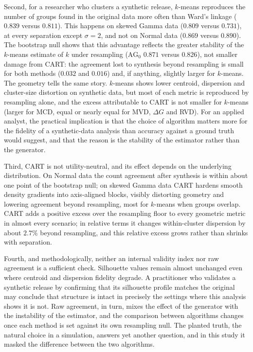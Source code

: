 \documentclass[pdflatex,referee]{sn-jnl}
\begin{document}
Second, for a researcher who clusters a synthetic release, $k$-means
reproduces the number of groups found in the original data more often than
Ward's linkage ($0.839$ versus $0.811$). This happens on skewed Gamma data
($0.809$ versus $0.731$), at every separation except $\sigma = 2$, and not on
Normal data ($0.869$ versus $0.890$). The bootstrap null shows that this
advantage reflects the greater stability of the $k$-means estimate of $k$
under resampling ($\mathrm{AG}_0$ $0.871$ versus $0.826$), not smaller damage
from CART: the agreement lost to synthesis beyond resampling is small for
both methods ($0.032$ and $0.016$) and, if anything, slightly larger for
$k$-means. The geometry tells the same story. $k$-means shows lower centroid,
dispersion and cluster-size distortion on synthetic data, but most of each
metric is reproduced by resampling alone, and the excess attributable to CART
is not smaller for $k$-means (larger for MCD, equal or nearly equal for MVD, $\Delta G$ and RVD). For an applied analyst, the practical implication is that the choice of
algorithm matters more for the fidelity of a synthetic-data analysis than
accuracy against a ground truth would suggest, and that the reason is the
stability of the estimator rather than the generator.

Third, CART is not utility-neutral, and its effect depends on the underlying
distribution. On Normal data the count agreement after synthesis is within
about one point of the bootstrap null; on skewed Gamma data CART hardens smooth
density gradients into axis-aligned blocks, visibly distorting geometry and
lowering agreement beyond resampling, most for $k$-means when groups overlap.
CART adds a positive excess over the resampling floor to every geometric
metric in almost every scenario; in relative terms it changes within-cluster
dispersion by about $2.7\%$ beyond resampling, and this relative excess grows
rather than shrinks with separation.

Fourth, and methodologically, neither an internal validity index nor raw
agreement is a sufficient check. Silhouette values remain almost unchanged
even where centroid and dispersion fidelity degrade. A practitioner who
validates a synthetic release by confirming that its silhouette profile
matches the original may conclude that structure is intact in precisely the
settings where this analysis shows it is not. Raw agreement, in turn, mixes
the effect of the generator with the instability of the estimator, and the
comparison between algorithms changes once each method is set against its own
resampling null. The planted truth, the natural choice in a simulation,
answers yet another question, and in this study it masked the difference
between the two algorithms.
\end{document}
